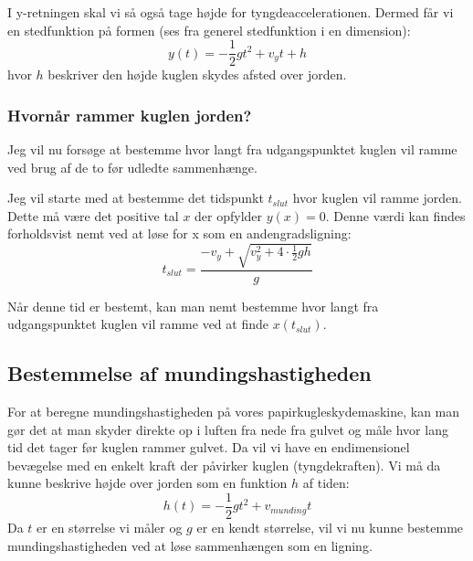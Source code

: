 \documentclass[12pt,a4paper]{article}
\theoremstyle{break}
\theoremstyle{nonumberplain}
\begin{document}
I y-retningen skal vi så også tage højde for tyngdeaccelerationen.
Dermed får vi en stedfunktion på formen (ses fra generel stedfunktion i en dimension): $$y(t)=-\frac{1}{2}gt^2+v_yt+h$$
hvor $h$ beskriver den højde kuglen skydes afsted over jorden.

\subsubsection{Hvornår rammer kuglen jorden?}
Jeg vil nu forsøge at bestemme hvor langt fra udgangspunktet kuglen vil ramme ved brug af de to før udledte sammenhænge.

Jeg vil starte med at bestemme det tidspunkt $t_{slut}$ hvor kuglen vil ramme jorden.
Dette må være det positive tal $x$ der opfylder $y(x)=0$. 
Denne værdi kan findes forholdsvist nemt ved at løse for x som en andengradsligning:
$$t_{slut} = \dfrac{-v_y + \sqrt{v_y^2 + 4 \cdot \frac{1}{2}gh}}{g}$$


Når denne tid er bestemt, kan man nemt bestemme hvor langt fra udgangspunktet kuglen vil ramme ved at finde $x(t_{slut})$.

\subsection{Bestemmelse af mundingshastigheden}
For at beregne mundingshastigheden på vores papirkugleskydemaskine, kan man gør det at man skyder direkte op i luften fra nede fra gulvet og måle hvor lang tid det tager før kuglen rammer gulvet.
Da vil vi have en endimensionel bevægelse med en enkelt kraft der påvirker kuglen (tyngdekraften). 
Vi må da kunne beskrive højde over jorden som en funktion $h$ af tiden:
$$h(t)=-\frac{1}{2}gt^2 + v_{munding}t$$
Da $t$ er en størrelse vi måler og $g$ er en kendt størrelse, vil vi nu kunne bestemme mundingshastigheden ved at løse sammenhængen som en ligning.
\end{document}
